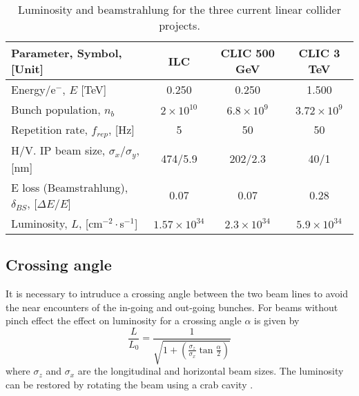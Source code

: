 \begin{table}[h]
{%
\centering
\begin{tabular}{l||c|c|c}\hline
Parameter, Symbol, [Unit]& ILC & CLIC 500 GeV& CLIC 3 TeV\\\hline\hline
Energy/e$^-$, $E$ [TeV]& 0.250 & 0.250 & 1.500\\
Bunch population, $n_b$ &$2\times10^{10}$&$6.8\times10^9$&$3.72\times10^9$\\
Repetition rate, $f_{rep}$, [Hz]&5 &50&50\\
H/V. IP beam size, $\sigma_x/\sigma_y$, [nm] &474/5.9&202/2.3&40/1\\\hline
E loss (Beamstrahlung), $\delta_{BS}$, [$\Delta E/E$]&0.07&0.07&0.28\\
Luminosity, $L$, [cm$^{-2}\cdot$s$^{-1}$]&$1.57\times10^{34}$ & $2.3\times10^{34}$&$5.9\times10^{34}$\\\hline
\end{tabular}\caption{Luminosity and beamstrahlung for the three current linear collider projects.}\label{t:beam_rad}
}
\end{table}
\subsection{Crossing angle}
It is necessary to intruduce a crossing angle between the two beam lines to avoid the near encounters of the in-going and out-going bunches. For beams without pinch effect the effect on luminosity for a crossing angle $\alpha$ is given by \cite{Napoly:240071}
\begin{equation}
 \frac{L}{L_0}=\frac{1}{\sqrt{1+\left(\frac{\sigma_z}{\sigma_x}\tan\frac{\alpha}{2}\right)}}
\end{equation}
where $\sigma_z$ and $\sigma_x$ are the longitudinal and horizontal beam sizes. The luminosity can be restored by rotating the beam using a crab cavity \cite{PhysRevSTAB.16.041001}.
